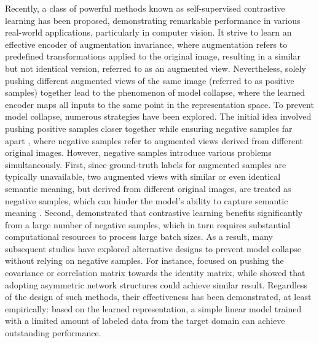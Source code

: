 Recently, a class of powerful methods known as self-supervised contrastive learning has been proposed, demonstrating remarkable performance in various real-world applications, particularly in computer vision. It strive to learn an effective encoder of augmentation invariance, where augmentation refers to predefined transformations applied to the original image, resulting in a similar but not identical version, referred to as an augmented view. Nevertheless, solely pushing different augmented views of the same image (referred to as positive samples) together lead to the phenomenon of model collapse, where the learned encoder maps all inputs to the same point in the representation space. To prevent model collapse, numerous strategies have been explored. The initial idea involved pushing positive samples closer together while ensuring negative samples far apart \citep{ye2019invarspread, he2020momentum, chen2020simclr, haochen2021spectral}, where negative samples refer to augmented views derived from different original images. However, negative samples introduce various problems simultaneously. First, since ground-truth labels for augmented samples are typically unavailable, two augmented views with similar or even identical semantic meaning, but derived from different original images, are treated as negative samples, which can hinder the model's ability to capture semantic meaning \citep{chuang2020debiased, chuang2022robust}. Second, \citet{chen2020simclr} demonstrated that contrastive learning benefits significantly from a large number of negative samples, which in turn requires substantial computational resources to process large batch sizes. As a result, many subsequent studies have explored alternative designs to prevent model collapse without relying on negative samples. For instance, \citet{zbontar2021barlow, ermolov2021whitening, adrien2022vicreg, duan2024unsupervisedtransferlearningadversarial} focused on pushing the covariance or correlation matrix towards the identity matrix, while \citet{grill2020bootstrap, chen2021exploring} showed that adopting asymmetric network structures could achieve similar result. Regardless of the design of such methods, their effectiveness has been demonstrated, at least empirically: based on the learned representation, a simple linear model trained with a limited amount of labeled data from the target domain can achieve outstanding performance. 

